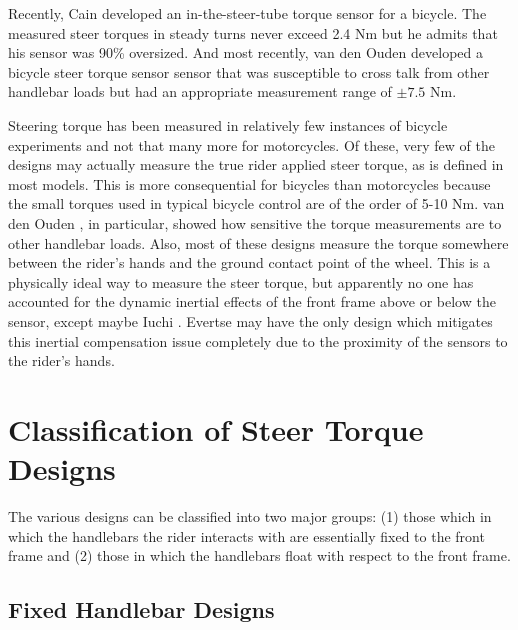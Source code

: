\documentclass[10pt]{article}
\begin{document}
Recently, Cain \cite{Cain2012} developed an in-the-steer-tube torque sensor for
a bicycle. The measured steer torques in steady turns never exceed 2.4 Nm but
he admits that his sensor was 90\% oversized. And most recently, van den Ouden
\cite{Ouden2011} developed a bicycle steer torque sensor sensor that was
susceptible to cross talk from other handlebar loads but had an appropriate
measurement range of $\pm7.5$ Nm.

Steering torque has been measured in relatively few instances of bicycle
experiments and not that many more for motorcycles. Of these, very few of the
designs may actually measure the true rider applied steer torque, as is defined
in most models. This is more consequential for bicycles than motorcycles
because the small torques used in typical bicycle control are of the order of
5-10 Nm. van den Ouden \cite{Ouden2011}, in particular, showed how sensitive
the torque measurements are to other handlebar loads. Also, most of these
designs measure the torque somewhere between the rider's hands and the ground
contact point of the wheel. This is a physically ideal way to measure the steer
torque, but apparently no one has accounted for the dynamic inertial effects of
the front frame above or below the sensor, except maybe Iuchi \cite{Iuchi2006}.
Evertse \cite{Evertse2010} may have the only design which mitigates this
inertial compensation issue completely due to the proximity of the sensors to
the rider's hands.


\section*{Classification of Steer Torque Designs}

The various designs can be classified into two major groups: (1) those which in
which the handlebars the rider interacts with are essentially fixed to the
front frame and (2) those in which the handlebars float with respect to the
front frame.

\subsection*{Fixed Handlebar Designs}
\end{document}
